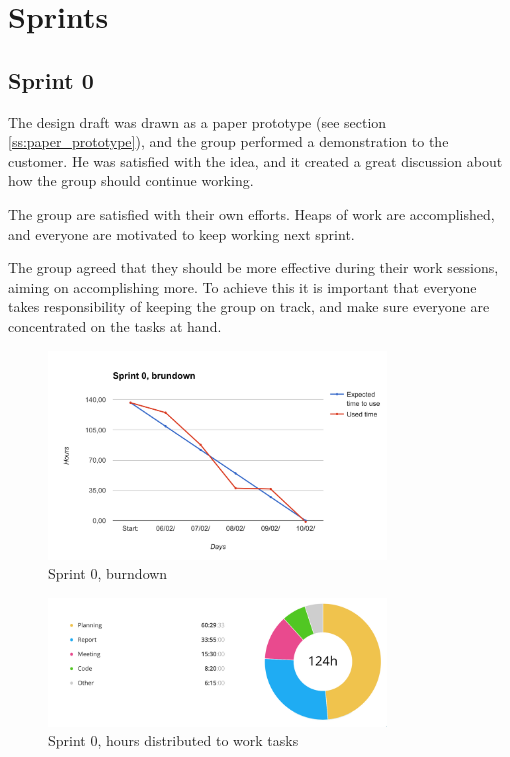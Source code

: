 \chapter{Sprints}
\label{Sprints}

\section{Sprint 0}
The design draft was drawn as a paper prototype (see section \ref{ss:paper_prototype}), and the group performed a demonstration to the customer. He was satisfied with the idea, and it created a great discussion about how the group should continue working.

The group are satisfied with their own efforts. Heaps of work are accomplished, and everyone are motivated to keep working next sprint.
    
The group agreed that they should be more effective during their work sessions, aiming on accomplishing more. To achieve this it is important that everyone takes responsibility of keeping the group on track, and  make sure everyone are concentrated on the tasks at hand.

\begin{figure}[ht]
\centering
    \includegraphics[width=0.8\textwidth]{fig/sprint0}
\caption{Sprint 0, burndown}
\end{figure}

\begin{figure}[ht]
\centering
    \includegraphics[width=0.8\textwidth]{fig/sprint0-diagram}
\caption{Sprint 0, hours distributed to work tasks}
\end{figure}

